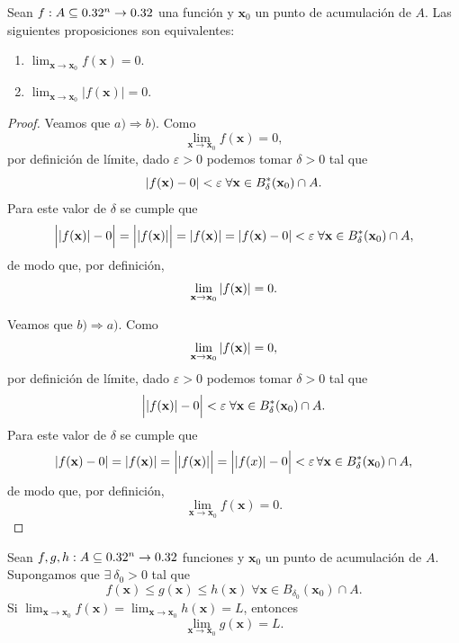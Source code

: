   \begin{propertie} \label{prop:lim_1}
    Sean $f:A  \subseteq  0.32^n \to 0.32$ una funci\'on y $\mathbf{x}_0$ un punto de acumulaci\'on de $A$. Las siguientes proposiciones son equivalentes:
 \begin{enumerate} 
  \item[a)] $\lim_{\mathbf{x} \to \mathbf{x}_0} f(\mathbf{x}) = 0$.
  \item[b)] $\lim_{\mathbf{x} \to \mathbf{x}_0} | f(\mathbf{x}) | = 0$.
 \end{enumerate}
\end{propertie} 
\begin{proof}   Veamos que $a) \Rightarrow b).$  Como 
  \[
   \lim_{\mathbf{x} \to \mathbf{x}_0} f(\mathbf{x}) = 0,
  \]
  por definici\'on de l\'imite, dado $\varepsilon > 0$ podemos tomar $\delta > 0$ tal que 
  \[
   \abs{f(\mathbf{x}) - 0} < \varepsilon \; \forall \mathbf{x} \in B^*_{\delta}(\mathbf{x}_0) \cap A.
  \]
  Para este valor de $\delta$ se cumple que
  \[
   \Big| \abs{f(\mathbf{x})} - 0 \Big| = \Big| \abs{f(\mathbf{x})} \Big| = \abs{f(\mathbf{x})} = \abs{f(\mathbf{x}) - 0} < \varepsilon \; 
   \forall \mathbf{x} \in B^*_{\delta}(\mathbf{x}_0) \cap A,
  \]
  de modo que, por definici\'on, 
  \[
   \lim_{\mathbf{x} \to \mathbf{x}_0} \abs{ f(\mathbf{x}) } = 0.
  \]
  
Veamos que  $b) \Rightarrow a).$  Como
  \[
   \lim_{\mathbf{x} \to \mathbf{x}_0} \abs{ f(\mathbf{x}) } = 0,
  \]
  por definici\'on de l\'imite, dado $\varepsilon > 0$ podemos tomar $\delta > 0$ tal que 
  \[
   \Big| \abs{f(\mathbf{x})} - 0 \Big| < \varepsilon \; \forall \mathbf{x} \in B^*_{\delta}(\mathbf{x}_0) \cap A.
  \]
  Para este valor de $\delta$ se cumple que
  \[
   \abs{f(\mathbf{x}) - 0} = \abs{f(\mathbf{x})} = \Big| \abs{f(\mathbf{x})} \Big| = \Big| \abs{f(x)} - 0 \Big| < \varepsilon \, 
   \forall \mathbf{x} \in B^*_{\delta}(\mathbf{x}_0) \cap A,
  \]
  de modo que, por definici\'on, 
  \[
   \lim_{\mathbf{x} \to \mathbf{x}_0} f(\mathbf{x}) = 0.
  \]
 \end{proof}



\begin{propertie} \label{prop:sandwich} %
Sean $f, g, h : A  \subseteq  0.32^n \to 0.32$ funciones y $\mathbf{x}_0$ un punto de acumulaci\'on de $A$. Supongamos que $\exists\: \delta_0 > 0$ tal que 
\[
 f(\mathbf{x}) \le g(\mathbf{x}) \le h(\mathbf{x}) \; \forall \mathbf{x} \in B_{\delta_0}(\mathbf{x}_0) \cap A.
\]
Si $\lim_{\mathbf{x} \to \mathbf{x}_0}f(\mathbf{x}) = \lim_{\mathbf{x} \to \mathbf{x}_0}h(\mathbf{x}) = L$, entonces
\[
 \lim_{\mathbf{x} \to \mathbf{x}_0}g(\mathbf{x}) = L.
\]
 
\end{propertie}

